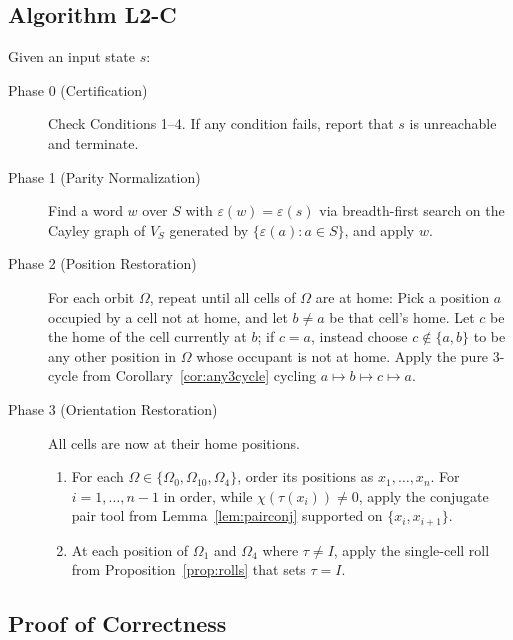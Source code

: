 \documentclass[a4paper,11pt]{article}
\begin{document}
\subsection{Algorithm L2-C}

Given an input state $s$:
\begin{description}
\item[Phase 0 (Certification)] Check Conditions 1--4. If any condition fails, report that $s$ is unreachable and terminate.
\item[Phase 1 (Parity Normalization)] Find a word $w$ over $S$ with $\varepsilon(w)=\varepsilon(s)$ via breadth-first search on the Cayley graph of $V_S$ generated by $\{\varepsilon(a):a\in S\}$, and apply $w$.
\item[Phase 2 (Position Restoration)] For each orbit $\Omega$, repeat until all cells of $\Omega$ are at home:
Pick a position $a$ occupied by a cell not at home, and let $b\ne a$ be that cell's home.
Let $c$ be the home of the cell currently at $b$; if $c=a$, instead choose $c\notin\{a,b\}$ to be any other position in $\Omega$ whose occupant is not at home.
Apply the pure 3-cycle from Corollary~\ref{cor:any3cycle} cycling $a\mapsto b\mapsto c\mapsto a$.
\item[Phase 3 (Orientation Restoration)] All cells are now at their home positions.
\begin{enumerate}
\item[(a)] For each $\Omega\in\{\Omega_0,\Omega_{10},\Omega_4\}$, order its positions as $x_1,\dots,x_n$.
For $i=1,\dots,n-1$ in order, while $\chi(\tau(x_i))\ne0$, apply the conjugate pair tool from Lemma~\ref{lem:pairconj} supported on $\{x_i,x_{i+1}\}$.
\item[(b)] At each position of $\Omega_1$ and $\Omega_4$ where $\tau\ne I$, apply the single-cell roll from Proposition~\ref{prop:rolls} that sets $\tau=I$.
\end{enumerate}
\end{description}

\subsection{Proof of Correctness}
\end{document}
